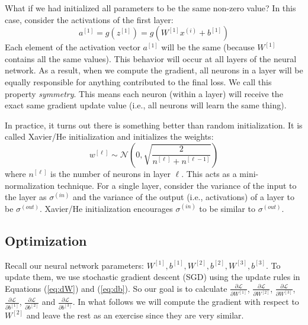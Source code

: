 \documentclass{article}
\numberwithin{equation}{section}
\begin{document}
What if we had initialized all parameters to be the same non-zero value?
In this case, consider the activations of the first layer:
\begin{equation}
a^{[1]} = g(z^{[1]}) = g(W^{[1]} x^{(i)} + b^{[1]})
\end{equation}
Each element of the activation vector $a^{[1]}$ will be the same (because $W^{[1]}$ contains all the same values).
This behavior will occur at all layers of the neural network.
As a result, when we compute the gradient, all neurons in a layer will be equally responsible for anything contributed to the final loss.
We call this property \textit{symmetry}.
This means each neuron (within a layer) will receive the exact same gradient update value (i.e., all neurons will learn the same thing).

In practice, it turns out there is something better than random initialization.
It is called Xavier/He initialization and initializes the weights:
\begin{equation}
w^{[\ell]} \sim \mathcal{N}\left(0,  \sqrt{ \frac{2}{n^{[\ell]} + n^{[\ell - 1]} }} \right)
\end{equation}
where $n^{[\ell]}$ is the number of neurons in layer $\ell$. This acts as a mini-normalization technique. For a single layer, consider the variance of the input to the layer as $\sigma^{(in)}$ and the variance of the output (i.e., activations) of a layer to be $\sigma^{(out)}$. Xavier/He initialization encourages $\sigma^{(in)}$ to be similar to $\sigma^{(out)}$. 

\subsection{Optimization}
 
Recall our neural network parameters: $W^{[1]}, b^{[1]}, W^{[2]}, b^{[2]}, W^{[3]}, b^{[3]}$.
To update them, we use stochastic gradient descent (SGD) using the update rules in Equations (\ref{eq:dW}) and (\ref{eq:db}). So our goal is to calculate $\frac{\partial \mathcal{L}}{\partial W^{[1]}}$, $\frac{\partial \mathcal{L}}{\partial W^{[2]}}$, $\frac{\partial \mathcal{L}}{\partial W^{[3]}}$, $\frac{\partial \mathcal{L}}{\partial b^{[1]}}$, $\frac{\partial \mathcal{L}}{\partial b^{[2]}}$ and $\frac{\partial \mathcal{L}}{\partial b^{[3]}}$. In what follows we will compute the gradient with respect to $W^{[2]}$ and leave the rest as an exercise since they are very similar.
\end{document}
